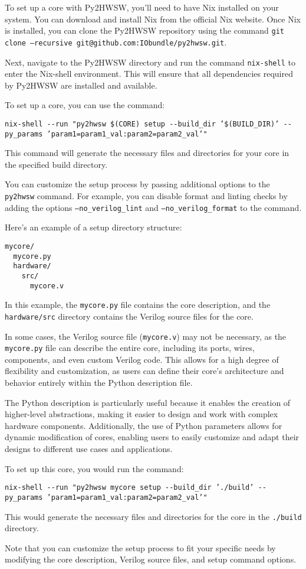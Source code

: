 %

To set up a core with Py2HWSW, you'll need to have Nix installed on your system. You can download and install Nix from the official Nix website. Once Nix is installed, you can clone the Py2HWSW repository using the command \texttt{git clone --recursive git@github.com:IObundle/py2hwsw.git}.

Next, navigate to the Py2HWSW directory and run the command \texttt{nix-shell} to enter the Nix-shell environment. This will ensure that all dependencies required by Py2HWSW are installed and available.

To set up a core, you can use the command:
\begin{verbatim}
nix-shell --run "py2hwsw $(CORE) setup --build_dir ’$(BUILD_DIR)’ --py_params ’param1=param1_val:param2=param2_val’"
\end{verbatim}

This command will generate the necessary files and directories for your core in the specified build directory.

You can customize the setup process by passing additional options to the \texttt{py2hwsw} command. For example, you can disable format and linting checks by adding the options \texttt{--no\_verilog\_lint} and \texttt{--no\_verilog\_format} to the command.

Here's an example of a setup directory structure:
\begin{verbatim}
mycore/
  mycore.py
  hardware/
    src/
      mycore.v
\end{verbatim}
In this example, the \texttt{mycore.py} file contains the core description, and the \texttt{hardware/src} directory contains the Verilog source files for the core.

In some cases, the Verilog source file (\texttt{mycore.v}) may not be necessary, as the \texttt{mycore.py} file can describe the entire core, including its ports, wires, components, and even custom Verilog code. This allows for a high degree of flexibility and customization, as users can define their core's architecture and behavior entirely within the Python description file.

The Python description is particularly useful because it enables the creation of higher-level abstractions, making it easier to design and work with complex hardware components. Additionally, the use of Python parameters allows for dynamic modification of cores, enabling users to easily customize and adapt their designs to different use cases and applications.

To set up this core, you would run the command:
\begin{verbatim}
nix-shell --run "py2hwsw mycore setup --build_dir ’./build’ --py_params ’param1=param1_val:param2=param2_val’"
\end{verbatim}

This would generate the necessary files and directories for the core in the \texttt{./build} directory.

Note that you can customize the setup process to fit your specific needs by modifying the core description, Verilog source files, and setup command options.

